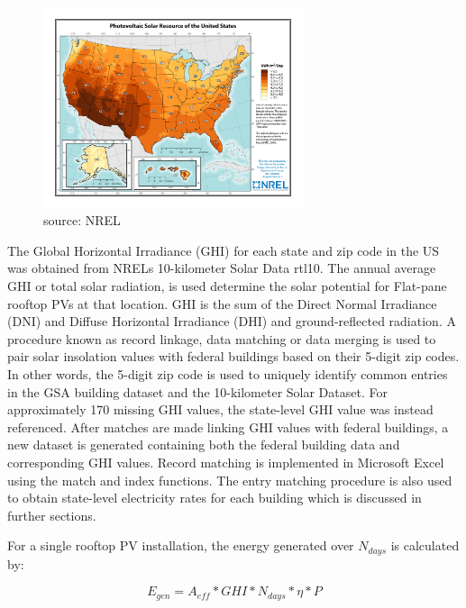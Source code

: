 \begin{figure}
  \begin{center}
    \includegraphics[width=0.68\textwidth]{pics/rtl_pic3}
  \end{center}
  \caption{source: NREL}
\label{fig:rtl_pic3}
\end{figure}

The Global Horizontal Irradiance (GHI) for each state and zip code in the US was obtained from NRELs 10-kilometer Solar Data \cite{roisin}{rtl10}. The annual average GHI or total solar radiation, is used determine the solar potential for Flat-pane rooftop PVs at that location. GHI is the sum of the Direct Normal Irradiance (DNI) and Diffuse Horizontal Irradiance (DHI) and ground-reflected radiation.  A procedure known as record linkage, data matching or data merging is used to pair solar insolation values with federal buildings based on their 5-digit zip codes.  In other words, the 5-digit zip code is used to uniquely identify common entries in the GSA building dataset and the 10-kilometer Solar Dataset. For approximately 170 missing GHI values, the state-level GHI value was instead referenced. After matches are made linking GHI values with federal buildings, a new dataset is generated containing both the federal building data and corresponding GHI values. Record matching is implemented in Microsoft Excel using the match and index functions.  The entry matching procedure is also used to obtain state-level electricity rates for each building which is discussed in further sections.  
\par
For a single rooftop PV installation, the energy generated over $N_{days}$ is calculated by:  

\begin{equation}
E_{gen}=A_{eff}*GHI*N_{days}*\eta*P 
\end{equation}

